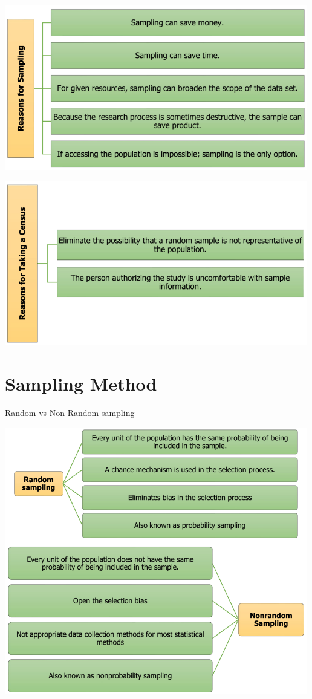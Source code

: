 \documentclass[
  a4paper,
  DIV=11,
  numbers=noendperiod,
  oneside]{scrreprt}
\begin{document}
\includegraphics[width=5.20833in,height=\textheight]{images/ch1/Picture9.png}

\includegraphics[width=5.20833in,height=\textheight]{images/ch1/Picture10.png}

\hypertarget{sampling-method}{%
\section{Sampling Method}\label{sampling-method}}

Random vs Non-Random sampling

\includegraphics[width=5.20833in,height=\textheight]{images/ch1/Picture11.png}
\end{document}
